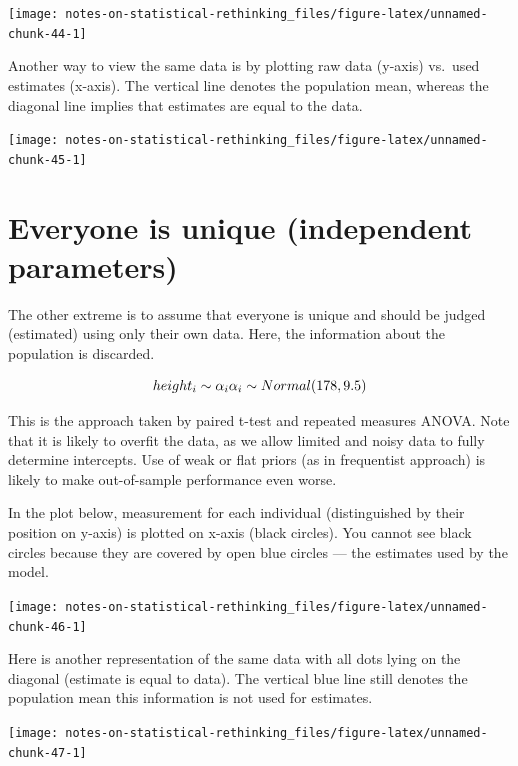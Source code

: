 \documentclass[
]{book}
\begin{document}
\begin{center}\texttt{[image: notes-on-statistical-rethinking\_files/figure-latex/unnamed-chunk-44-1]} \end{center}

Another way to view the same data is by plotting raw data (y-axis) vs.~used estimates (x-axis). The vertical line denotes the population mean, whereas the diagonal line implies that estimates are equal to the data.

\begin{center}\texttt{[image: notes-on-statistical-rethinking\_files/figure-latex/unnamed-chunk-45-1]} \end{center}

\hypertarget{everyone-is-unique-independent-parameters}{%
\section{Everyone is unique (independent parameters)}\label{everyone-is-unique-independent-parameters}}

The other extreme is to assume that everyone is unique and should be judged (estimated) using only their own data. Here, the information about the population is discarded.

\[height_i \sim \alpha_i\\
\alpha_i \sim Normal(178, 9.5)\]

This is the approach taken by paired t-test and repeated measures ANOVA. Note that it is likely to overfit the data, as we allow limited and noisy data to fully determine intercepts. Use of weak or flat priors (as in frequentist approach) is likely to make out-of-sample performance even worse.

In the plot below, measurement for each individual (distinguished by their position on y-axis) is plotted on x-axis (black circles). You cannot see black circles because they are covered by open blue circles --- the estimates used by the model.

\begin{center}\texttt{[image: notes-on-statistical-rethinking\_files/figure-latex/unnamed-chunk-46-1]} \end{center}

Here is another representation of the same data with all dots lying on the diagonal (estimate is equal to data). The vertical blue line still denotes the population mean this information is not used for estimates.

\begin{center}\texttt{[image: notes-on-statistical-rethinking\_files/figure-latex/unnamed-chunk-47-1]} \end{center}
\end{document}
